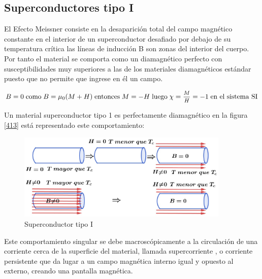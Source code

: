 \subsection{Superconductores tipo I}

El Efecto Meissner consiste en la desaparición total del campo magnético constante en el interior de un superconductor desafiado por debajo de su temperatura crítica las líneas de inducción B son zonas del interior del cuerpo. Por tanto el material se comporta como un diamagnético perfecto con susceptibilidades muy superiores a las de los materiales diamagnéticos estándar puesto que no permite que ingrese en él un campo.

\begin{equation}
	B=0 \; \text{como}  \; B=\mu_{0}(M+H) \; \text{entonces}  \; M=-H  \; \text{luego}  \; \chi=\mfrac{M}{H} = -1  \; \text{en el sistema SI} 
\end{equation}

Un material superconductor tipo 1 es perfectamente diamagnético en la figura \ref{413} está representado este comportamiento:


\begin{figure}[H]
    \centering
    \includegraphics[width=0.9\textwidth]{./Figures/fig413}
    \caption{Superconductor tipo I}
	\label{fig:413}
\end{figure}

Este comportamiento singular se debe macroscópicamente a la circulación de una corriente cerca de la superficie del material, llamada supercorriente , o corriente persistente que da lugar a un campo magnética interno igual y opuesto al externo, creando una pantalla magnética.


